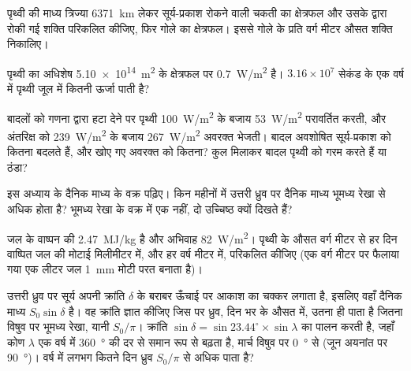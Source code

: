 \begin{exercise}[$\star\star$]\label{exo:g10:earth-energy-budget:8}
पृथ्वी की माध्य त्रिज्या \qty{6371}{km} लेकर सूर्य-प्रकाश रोकने वाली चकती का
क्षेत्रफल और उसके द्वारा रोकी गई शक्ति परिकलित कीजिए, फिर गोले का क्षेत्रफल।
इससे गोले के प्रति वर्ग मीटर औसत शक्ति निकालिए।
\end{exercise}

\begin{exercise}[$\star\star$]\label{exo:g10:earth-energy-budget:9}
पृथ्वी का अधिशेष \qty{5.10e14}{m^2} के क्षेत्रफल पर
\qty{0.7}{W/m^2} है। $3.16\times10^7$ सेकंड के एक वर्ष में पृथ्वी जूल में कितनी ऊर्जा
पाती है?
\end{exercise}

\begin{exercise}[$\star\star$]\label{exo:g10:earth-energy-budget:10}
बादलों को गणना द्वारा हटा देने पर पृथ्वी \qty{100}{W/m^2} के बजाय
\qty{53}{W/m^2} परावर्तित करती, और अंतरिक्ष को \qty{239}{W/m^2} के बजाय \qty{267}{W/m^2}
अवरक्त भेजती। बादल अवशोषित सूर्य-प्रकाश को कितना बदलते हैं, और खोए गए अवरक्त को
कितना? कुल मिलाकर बादल पृथ्वी को गरम करते हैं या
ठंडा?
\end{exercise}

\begin{exercise}[$\star\star$]\label{exo:g10:earth-energy-budget:11}
इस अध्याय के दैनिक माध्य  के वक्र पढ़िए। किन महीनों में उत्तरी ध्रुव पर दैनिक
माध्य  भूमध्य रेखा से अधिक होता है? भूमध्य रेखा के वक्र में एक नहीं, दो
उच्चिष्ठ क्यों दिखते हैं?
\end{exercise}

\begin{exercise}[$\star\star\star$]\label{exo:g10:earth-energy-budget:12}
जल के वाष्पन की  \qty{2.47}{MJ/kg} है और 
अभिवाह \qty{82}{W/m^2}। पृथ्वी के औसत वर्ग मीटर से हर दिन वाष्पित जल की मोटाई
मिलीमीटर में, और हर वर्ष मीटर में, परिकलित कीजिए (एक वर्ग मीटर पर फैलाया गया एक लीटर
जल \qty{1}{mm} मोटी परत बनाता है)।
\end{exercise}

\begin{exercise}[$\star\star\star$]\label{exo:g10:earth-energy-budget:13}
उत्तरी ध्रुव पर सूर्य अपनी क्रांति $\delta$ के बराबर ऊँचाई पर आकाश का चक्कर लगाता है,
इसलिए वहाँ दैनिक माध्य  $S_0 \sin
\delta$ है। वह क्रांति ज्ञात कीजिए जिस पर ध्रुव, दिन भर के औसत में, उतना ही पाता है
जितना विषुव पर भूमध्य रेखा, यानी $S_0/\pi$। क्रांति
$\sin\delta = \sin 23.44^\circ \times \sin\lambda$ का पालन करती है, जहाँ
कोण $\lambda$ एक वर्ष में \qty{360}{\degree} की दर से समान रूप से बढ़ता है, मार्च विषुव पर
\qty{0}{\degree} से (जून अयनांत पर \qty{90}{\degree})। वर्ष में लगभग कितने दिन
ध्रुव $S_0/\pi$ से अधिक पाता है?
\end{exercise}

